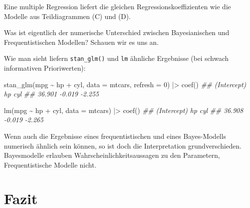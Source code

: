 \documentclass[
  ngerman,
  letterpaper,
  twoside,
  open=any]{scrbook}
\newenvironment{Shaded}{\begin{snugshade}}{\end{snugshade}}
\newcommand{\AttributeTok}[1]{\textcolor[rgb]{0.40,0.45,0.13}{#1}}
\newcommand{\DecValTok}[1]{\textcolor[rgb]{0.68,0.00,0.00}{#1}}
\newcommand{\DocumentationTok}[1]{\textcolor[rgb]{0.37,0.37,0.37}{\textit{#1}}}
\newcommand{\FunctionTok}[1]{\textcolor[rgb]{0.28,0.35,0.67}{#1}}
\newcommand{\NormalTok}[1]{\textcolor[rgb]{0.00,0.23,0.31}{#1}}
\newcommand{\SpecialCharTok}[1]{\textcolor[rgb]{0.37,0.37,0.37}{#1}}
\theoremstyle{definition}
\theoremstyle{plain}
\theoremstyle{definition}
\theoremstyle{definition}
\theoremstyle{definition}
\theoremstyle{definition}
\theoremstyle{remark}
\begin{document}
Eine multiple Regression liefert die gleichen Regressionskoeffizienten
wie die Modelle aus Teildiagrammen (C) und (D).

Was ist eigentlich der numerische Unterschied zwischen Bayesianischen
und Frequentistischen Modellen? Schauen wir es uns an.

Wie man sieht liefern \texttt{stan\_glm()} und \texttt{lm} ähnliche
Ergebnisse (bei schwach informativen Prioriwerten):

\begin{Shaded}
\begin{Highlighting}[]
\FunctionTok{stan\_glm}\NormalTok{(mpg }\SpecialCharTok{\textasciitilde{}}\NormalTok{ hp }\SpecialCharTok{+}\NormalTok{ cyl, }\AttributeTok{data =}\NormalTok{ mtcars, }\AttributeTok{refresh =} \DecValTok{0}\NormalTok{) }\SpecialCharTok{|\textgreater{}} \FunctionTok{coef}\NormalTok{()}
\DocumentationTok{\#\# (Intercept)          hp         cyl }
\DocumentationTok{\#\#      36.901      {-}0.019      {-}2.255}

\FunctionTok{lm}\NormalTok{(mpg }\SpecialCharTok{\textasciitilde{}}\NormalTok{ hp }\SpecialCharTok{+}\NormalTok{ cyl, }\AttributeTok{data =}\NormalTok{ mtcars) }\SpecialCharTok{|\textgreater{}} \FunctionTok{coef}\NormalTok{()}
\DocumentationTok{\#\# (Intercept)          hp         cyl }
\DocumentationTok{\#\#      36.908      {-}0.019      {-}2.265}
\end{Highlighting}
\end{Shaded}

\begin{tcolorbox}[enhanced jigsaw, arc=.35mm, bottomrule=.15mm, bottomtitle=1mm, breakable, colback=white, colbacktitle=quarto-callout-important-color!10!white, colframe=quarto-callout-important-color-frame, coltitle=black, left=2mm, leftrule=.75mm, opacityback=0, opacitybacktitle=0.6, rightrule=.15mm, title=\textcolor{quarto-callout-important-color}{\faExclamation}\hspace{0.5em}{Wichtig}, titlerule=0mm, toprule=.15mm, toptitle=1mm]

Wenn auch die Ergebnisse eines frequentistischen und eines Bayes-Modells
numerisch ähnlich sein können, so ist doch die Interpretation
grundverschieden. Bayesmodelle erlauben Wahrscheinlichkeitsaussagen zu
den Parametern, Frequentistische Modelle nicht.

\end{tcolorbox}

\section{Fazit}\label{fazit-5}
\end{document}
